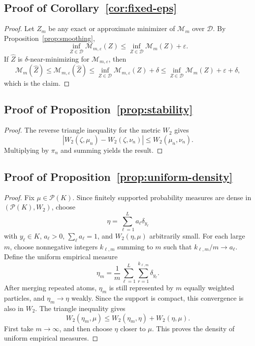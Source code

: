 \documentclass[pdflatex,sn-mathphys-ay]{sn-jnl}%
\theoremstyle{thmstyleone}%
\theoremstyle{thmstyletwo}%
\theoremstyle{thmstylethree}%
\newcommand{\calP}{\mathcal P}
\newcommand{\calM}{\mathcal M}
\newcommand{\eps}{\varepsilon}
\begin{document}
\begin{appendices}
\subsection{Proof of Corollary~\ref{cor:fixed-eps}}
\begin{proof}
Let \(Z_m\) be any exact or approximate minimizer of \(\calM_m\) over \(\mathcal D\). By Proposition~\ref{prop:smoothing},
\[
\inf_{Z\in\mathcal D}\calM_{m,\eps}(Z)
\le
\inf_{Z\in\mathcal D}\calM_m(Z)+\eps.
\]
If \(\hat Z\) is \(\delta\)-near-minimizing for \(\calM_{m,\eps}\), then
\[
\calM_m(\hat Z)
\le
\calM_{m,\eps}(\hat Z)
\le
\inf_{Z\in\mathcal D}\calM_{m,\eps}(Z)+\delta
\le
\inf_{Z\in\mathcal D}\calM_m(Z)+\eps+\delta,
\]
which is the claim.
\end{proof}

\subsection{Proof of Proposition~\ref{prop:stability}}
\begin{proof}
The reverse triangle inequality for the metric \(W_2\) gives
\[
\left|W_2(\zeta,\mu_n)-W_2(\zeta,\nu_n)\right|\le W_2(\mu_n,\nu_n).
\]
Multiplying by \(\pi_n\) and summing yields the result.
\end{proof}


\subsection{Proof of Proposition~\ref{prop:uniform-density}}
\begin{proof}
Fix \(\mu\in\calP(K)\). Since finitely supported probability measures are dense in \((\calP(K),W_2)\), choose
\[
    \eta=\sum_{\ell=1}^{L} a_\ell\delta_{y_\ell}
\]
with \(y_\ell\in K\), \(a_\ell>0\), \(\sum_\ell a_\ell=1\), and \(W_2(\eta,\mu)\) arbitrarily small. For each large \(m\), choose nonnegative integers \(k_{\ell,m}\) summing to \(m\) such that \(k_{\ell,m}/m\to a_\ell\). Define the uniform empirical measure
\[
    \eta_m=\frac1m\sum_{\ell=1}^{L}\sum_{r=1}^{k_{\ell,m}}\delta_{y_\ell}.
\]
After merging repeated atoms, \(\eta_m\) is still represented by \(m\) equally weighted particles, and \(\eta_m\to\eta\) weakly. Since the support is compact, this convergence is also in \(W_2\). The triangle inequality gives
\[
    W_2(\eta_m,\mu)\le W_2(\eta_m,\eta)+W_2(\eta,\mu).
\]
First take \(m\to\infty\), and then choose \(\eta\) closer to \(\mu\). This proves the density of uniform empirical measures.
\end{proof}



\end{appendices}
\end{document}

